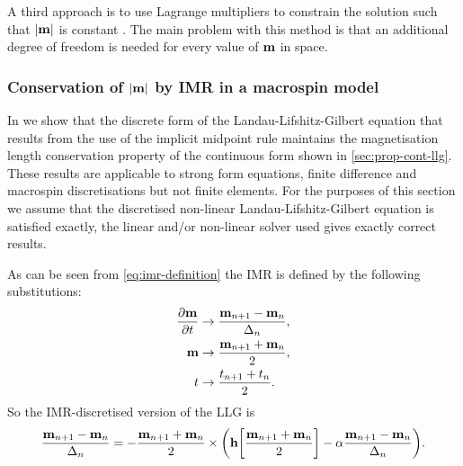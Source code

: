 A third approach is to use Lagrange multipliers to constrain the solution such that $\left|{\boldsymbol{\mathrm{m}}} \right|$ is constant \cite{Szambolics2008a}.
The main problem with this method is that an additional degree of freedom is needed for every value of $\boldsymbol{\mathrm{m}}$ in space.

\subsubsection{Conservation of $\left|{\boldsymbol{\mathrm{m}}} \right|$ by IMR in a macrospin model}
\label{sec:proof-magn-length-ode-imr-llg}

In  we show that the discrete form of the Landau-Lifshitz-Gilbert equation that results from the use of the implicit midpoint rule maintains the magnetisation length conservation property of the continuous form shown in \cref{sec:prop-cont-llg}.
These results are applicable to strong form equations, \ie finite difference and macrospin discretisations but not finite elements.
For the purposes of this section we assume that the discretised non-linear Landau-Lifshitz-Gilbert equation is satisfied exactly, \ie the linear and/or non-linear solver used gives exactly correct results.

As can be seen from \cref{eq:imr-definition} the IMR is defined by the following substitutions:
\begin{equation}
\begin{aligned}
  \label{eq:55}
  \frac{\partial \boldsymbol{\mathrm{m}}}{\partial t} &\rightarrow \frac{\boldsymbol{\mathrm{m}}_{n+1} - \boldsymbol{\mathrm{m}}_n}{\Delta_{n}}, \\
  \boldsymbol{\mathrm{m}} &\rightarrow \frac{\boldsymbol{\mathrm{m}}_{n+1} + \boldsymbol{\mathrm{m}}_n}{2}, \\
  t &\rightarrow \frac{t_{n+1} + t_n}{2}.
\end{aligned}
\end{equation}
So the IMR-discretised version of the LLG is
\begin{equation}
  \frac{\boldsymbol{\mathrm{m}}_{n+1} - \boldsymbol{\mathrm{m}}_n}{\Delta_{n}} = - \frac{\boldsymbol{\mathrm{m}}_{n+1} + \boldsymbol{\mathrm{m}}_n}{2} \times
  {\left( \boldsymbol{\mathrm{h}}{\left[ \frac{\boldsymbol{\mathrm{m}}_{n+1} + \boldsymbol{\mathrm{m}}_n}{2} \right]} - \alpha\frac{\boldsymbol{\mathrm{m}}_{n+1} - \boldsymbol{\mathrm{m}}_n}{\Delta_{n}} \right)}.
  \label{eqn:disc-llg}
\end{equation}

